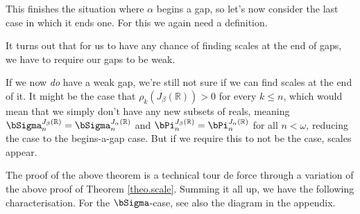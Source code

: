 This finishes the situation where $\alpha$ begins a gap, so let's now consider the last case in which it ends one. For this we again need a definition.


It turns out that for us to have any chance of finding scales at the end of gaps, we have to require our gaps to be weak.


If we now \textit{do} have a weak gap, we're still not sure if we can find scales at the end of it. It might be the case that $\rho_k(J_\beta(\mathbb R))>0$ for every $k\leq n$, which would mean that we simply don't have any new subsets of reals, meaning $\bSigma_n^{J_\beta(\mathbb R)}=\bSigma_n^{J_\alpha(\mathbb R)}$ and $\bPi_n^{J_\beta(\mathbb R)}=\bPi_n^{J_\alpha(\mathbb R)}$ for all $n<\omega$, reducing the case to the begins-a-gap case. But if we require this to not be the case, scales appear.


The proof of the above theorem is a technical tour de force through a variation of the above proof of Theorem \ref{theo.scale}. Summing it all up, we have the following characterisation. For the $\bSigma$-case, see also the diagram in the appendix.

